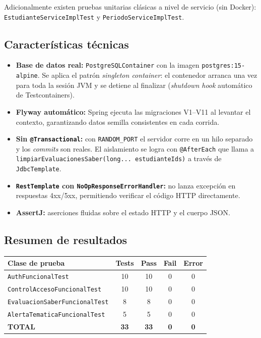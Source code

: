\documentclass[11pt,a4paper,oneside]{article}
\newcommand{\code}[1]{\texttt{\small #1}}
\begin{document}
Adicionalmente existen pruebas unitarias clásicas a nivel de servicio (sin Docker):
\code{EstudianteServiceImplTest} y \code{PeriodoServiceImplTest}.

\subsection{Características técnicas}

\begin{itemize}[leftmargin=*]
  \item \textbf{Base de datos real:} \code{PostgreSQLContainer} con la imagen
        \code{postgres:15-alpine}. Se aplica el patrón \emph{singleton container}: el
        contenedor arranca una vez para toda la sesión JVM y se detiene al finalizar
        (\emph{shutdown hook} automático de Testcontainers).
  \item \textbf{Flyway automático:} Spring ejecuta las migraciones V1--V11 al levantar el
        contexto, garantizando datos semilla consistentes en cada corrida.
  \item \textbf{Sin \code{@Transactional}:} con \code{RANDOM\_PORT} el servidor corre en un
        hilo separado y los \emph{commits} son reales. El aislamiento se logra con
        \code{@AfterEach} que llama a \code{limpiarEvaluacionesSaber(long... estudianteIds)}
        a través de \code{JdbcTemplate}.
  \item \textbf{\code{RestTemplate} con \code{NoOpResponseErrorHandler}:} no lanza excepción
        en respuestas 4xx/5xx, permitiendo verificar el código HTTP directamente.
  \item \textbf{AssertJ:} aserciones fluidas sobre el estado HTTP y el cuerpo JSON.
\end{itemize}

\subsection{Resumen de resultados}

\begin{table}[h]\centering\small\renewcommand{\arraystretch}{1.2}
\begin{tabular}{@{}l c c c c@{}}
\toprule
\textbf{Clase de prueba} & \textbf{Tests} & \textbf{Pass} & \textbf{Fail} & \textbf{Error} \\
\midrule
\code{AuthFuncionalTest}            & 10  & 10  & 0 & 0 \\
\code{ControlAccesoFuncionalTest}   & 10  & 10  & 0 & 0 \\
\code{EvaluacionSaberFuncionalTest} &  8  &  8  & 0 & 0 \\
\code{AlertaTematicaFuncionalTest}  &  5  &  5  & 0 & 0 \\
\midrule
\textbf{TOTAL}                      & \textbf{33} & \textbf{33} & \textbf{0} & \textbf{0} \\
\bottomrule
\end{tabular}
\end{table}
\end{document}
